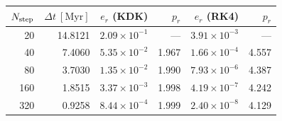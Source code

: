 \begin{tabular}{rrrrrr}\toprule
$N_{\rm step}$ & $\Delta t\ [\mathrm{Myr}]$ & $e_r$ (KDK) & $p_r$ & $e_r$ (RK4) & $p_r$ \\
\midrule
20 & 14.8121 & $2.09\times 10^{-1}$ & --- & $3.91\times 10^{-3}$ & --- \\
40 & 7.4060 & $5.35\times 10^{-2}$ & 1.967 & $1.66\times 10^{-4}$ & 4.557 \\
80 & 3.7030 & $1.35\times 10^{-2}$ & 1.990 & $7.93\times 10^{-6}$ & 4.387 \\
160 & 1.8515 & $3.37\times 10^{-3}$ & 1.998 & $4.19\times 10^{-7}$ & 4.242 \\
320 & 0.9258 & $8.44\times 10^{-4}$ & 1.999 & $2.40\times 10^{-8}$ & 4.129 \\
\bottomrule\end{tabular}
